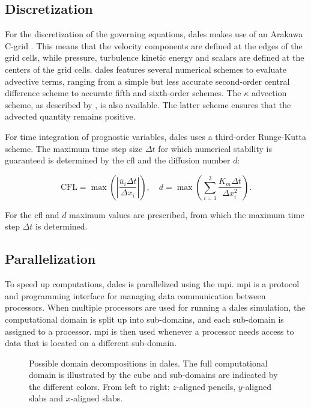 \subsection{Discretization}
For the discretization of the governing equations, \acrshort{dales} makes use of an Arakawa C-grid \citep{arakawaComputationalDesignBasic1977}. This means that the velocity components are defined at the edges of the grid cells, while pressure, turbulence kinetic energy and scalars are defined at the centers of the grid cells. \acrshort{dales} features several numerical schemes to evaluate advective terms, ranging from a simple but less accurate second-order central difference scheme to accurate fifth and sixth-order schemes. The $\kappa$ advection scheme, as described by \citet{hundsdorferPositiveFiniteDifferenceAdvection1995}, is also available. The latter scheme ensures that the advected quantity remains positive.

For time integration of prognostic variables, \acrshort{dales} uses a third-order Runge-Kutta scheme. The maximum time step size $\Delta t$ for which numerical stability is guaranteed is determined by the \acrfull{cfl} and the diffusion number $d$:

\begin{equation}
    \text{CFL} = \max \left( \left| \frac{\overline{u}_i \Delta t}{\Delta x_i} \right| \right), \quad d = \max \left( \sum_{i=1}^{3} \frac{K_m \Delta t}{\Delta x_i^2} \right).
\end{equation}

For the \acrshort{cfl} and $d$ maximum values are prescribed, from which the maximum time step $\Delta t$ is determined.

\subsection{Parallelization} \label{sec:dales_mpi}
To speed up computations, \acrshort{dales} is parallelized using the \acrfull{mpi}. \acrshort{mpi} is a protocol and programming interface for managing data communication between processors. When multiple processors are used for running a \acrshort{dales} simulation, the computational domain is split up into sub-domains, and each sub-domain is assigned to a processor. \acrshort{mpi} is then used whenever a processor needs access to data that is located on a different sub-domain. 

\begin{figure}[H]
    \centering
    
    \caption{Possible domain decompositions in \acrshort{dales}. The full computational domain is illustrated by the cube and sub-domains are indicated by the different colors. From left to right: $z$-aligned pencils, $y$-aligned slabs and $x$-aligned slabs.}
    \label{fig:dales_domain_decomposition}
\end{figure}

